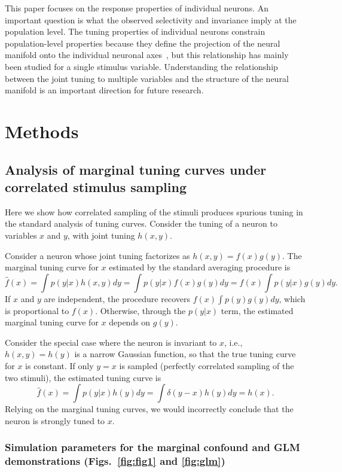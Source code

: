 \documentclass[11pt]{article}
\begin{document}
This paper focuses on the response properties of individual neurons. An important question is what the observed selectivity and invariance imply at the population level. The tuning properties of individual neurons constrain population-level properties because they define the projection of the neural manifold onto the individual neuronal axes~\cite{Kriegeskorte2021}, but this relationship has mainly been studied for a single stimulus variable. Understanding the relationship between the joint tuning to multiple variables and the structure of the neural manifold is an important direction for future research.

\newpage

\section{Methods}

\subsection{Analysis of marginal tuning curves under correlated stimulus sampling}
Here we show how correlated sampling of the stimuli produces spurious tuning in the standard analysis of tuning curves. Consider the tuning of a neuron to variables $x$ and $y$, with joint tuning $h(x,y)$.

Consider a neuron whose joint tuning factorizes as $h(x,y)=f(x)g(y)$. The marginal tuning curve for $x$ estimated by the standard averaging procedure is
$$
\hat{f}(x) = \int p(y|x)h(x,y)dy = \int p(y|x)f(x) g(y)dy =f(x)\int p(y|x)g(y)dy .
$$
If $x$ and $y$ are independent, the procedure recovers $f(x)\int p(y)g(y)dy$, which is proportional to $f(x)$. Otherwise, through the $p(y|x)$ term, the estimated marginal tuning curve for $x$ depends on $g(y)$.

Consider the special case where the neuron is invariant to $x$, i.e., $h(x,y)=h(y)$ is a narrow Gaussian function, so that the true tuning curve for $x$ is constant. If only $y=x$ is sampled (perfectly correlated sampling of the two stimuli), the estimated tuning curve is
$$
\hat{f}(x) = \int p(y|x)h(y)dy = \int \delta(y-x)h(y)dy=h(x).
$$
Relying on the marginal tuning curves, we would incorrectly conclude that the neuron is strongly tuned to $x$.

\subsubsection*{Simulation parameters for the marginal confound and GLM demonstrations (Figs.~\ref{fig:fig1} and \ref{fig:glm})}
\end{document}
